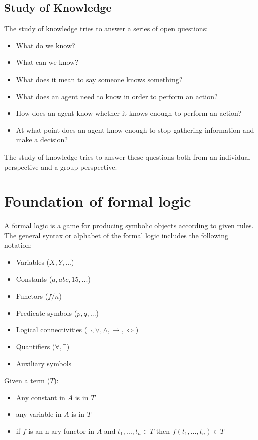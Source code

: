 \subsection{Study of Knowledge}
The study of knowledge tries to answer a series of open questions:
\begin{itemize}
\item What do we know?
\item What can we know?
\item What does it mean to say someone knows something?
\item What does an agent need to know in order to perform an action?
\item How does an agent know whether it knows enough to perform an action?
\item At what point does an agent know enough to stop gathering information and make a decision?
\end{itemize}

The study of knowledge tries to answer these questions both from an individual perspective and a group perspective.
\section{Foundation of formal logic}

A formal logic is a game for producing symbolic objects according to given rules.
The general syntax or alphabet of the formal logic includes the following notation:
\begin{itemize}
\item Variables ($X,Y, ...$)
\item Constants ($a, abc, 15, ...$)
\item Functors ($f/n$)
\item Predicate symbols ($p,q,...$)
\item Logical connectivities ($\neg, \lor, \land, \rightarrow, \iff$)
\item Quantifiers ($\forall, \exists$)
\item Auxiliary symbols
\end{itemize}

Given a term ($T$):
\begin{itemize}
\item Any constant in $A$ is in $T$
\item any variable in $A$ is in $T$
\item if $f$ is an n-ary functor in $A$ and $t_1, ... , t_n \in T$ then $f(t_1,..., t_n) \in T$
\end{itemize}

